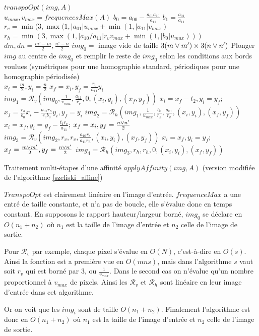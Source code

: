    \begin{algorithme}
    $transpoOpt(img,A)$\;\ \\
    $u_{max}, v_{max} = frequencesMax(A)$\;
	$b_0 = a_{00}-\frac{a_{01}a_{10}}{a_{11}}$\;
	$b_1 = \frac{a_{01}}{a_{11}}$\;
	$r_v = \min(3,\max (1,|a_{01}|u_{max}+\min (1,|a_{11}|v_{max})$\;
	$r_h = \min(3,\max (1,|a_{10}/a_{11}|r_vv_{max}+\min (1,|b_0|u_{max})))$\;
	\ \\
	$dm,dn = \frac{m'-m}{2},\frac{n'-n}{2}$\;
	$img_0 = $ image vide de taille $3(m \vee m') \times 3(n \vee n')$\;
	Plonger $img$ au centre de $img_0$ et remplir le reste de $img_0$ selon les conditions aux bords voulues (symétriques pour une homographie standard, périodiques pour une homographie périodisée)\;
	\ \\
	$x_i = \frac{m}{2}, y_i = \frac{n}{2}$\;
	$x_f = x_i, y_f = \frac{r_v}{a_{11}}y_i$\;
	$img_1 = \mathcal{R}_v(img_0,\frac{1}{v_{max}},\frac{a_{11}}{r_v},0,(x_i,y_i),(x_f,y_f))$\;
	$x_i = x_f-t_2, y_i = y_f$;
	$x_f = \frac{r_h}{b_0} x_i - \frac{a_{01}r_h}{r_v b_0} y_i, y_f = y_i$\;
	$img_2 = \mathcal{R}_h(img_1,\frac{1}{u_{max}},\frac{b_0}{r_h},\frac{a_{01}}{r_v},(x_i,y_i),(x_f,y_f))$\;
	$x_i = x_f, y_i = y_f - \frac{t_1r_v}{a_{11}}$;
	$x_f = x_i, y_f = \frac{n \vee n'}{2}$\;
	$img_3 = \mathcal{R}_v(img_2,r_v,r_v,\frac{a_{10}r_v}{a_{11}r_h},(x_i,y_i),(x_f,y_f))$\;
	$x_i = x_f, y_i = y_f$;
	$x_f = \frac{m \vee m'}{2}, y_f = \frac{n \vee n'}{2}$\;
	$img_4 = \mathcal{R}_h(img_3,r_h,r_h,0,(x_i,y_i),(x_f,y_f))$\;
    \caption{Traitement multi-étapes d'une affinité $applyAffinity(img,A)$ (version modifiée de l'algorithme \ref{szeliski_affine})}
    \label{algoPresqueAussiUniqueQueLesDeuxAutres}
   \end{algorithme}
   
   
   
   
   $TranspoOpt$ est clairement linéaire en l'image d'entrée. $frequenceMax$ a une entré de taille constante, et n'a pas de boucle, elle s'évalue donc en temps constant. En supposons le rapport hauteur/largeur borné, $img_0$ se déclare en $O(n_1+n_2)$ où $n_1$ est la taille de l'image d'entrée et $n_2$ celle de l'image de sortie.
   
   Pour ${\mathcal R}_v$ par exemple, chaque pixel s'évalue en $O(N)$, c'est-à-dire en $O(s)$. Ainsi la fonction est a première vue en $O(mns)$, mais dans l'algorithme $s$ vaut soit $r_v$ qui est borné par $3$, ou $\frac{1}{v_{max}}$. Dans le second cas on n'évalue qu'un nombre proportionnel à $v_{max}$ de pixels. Ainsi les ${\mathcal R}_v$ et ${\mathcal R}_h$ sont linéaire en leur image d'entrée dans cet algorithme.
   
   Or on voit que les $img_i$ sont de taille $O(n_1+n_2)$.
   \medbreak
   Finalement l'algorithme est donc en $O(n_1+n_2)$ où $n_1$ est la taille de l'image d'entrée et $n_2$ celle de l'image de sortie.
